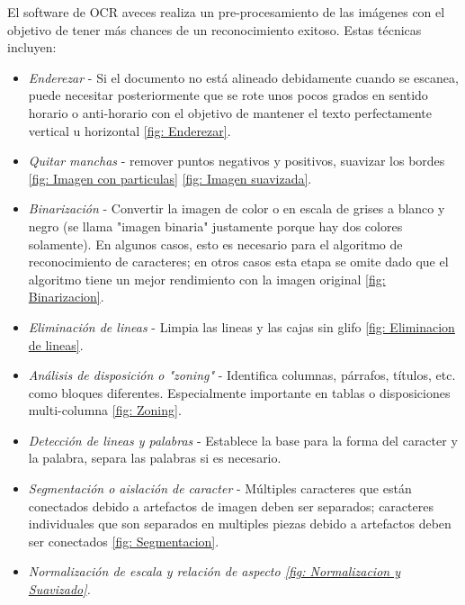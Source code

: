 		 El software de OCR aveces realiza un pre-procesamiento de las imágenes con el objetivo de tener más chances de un reconocimiento exitoso. Estas técnicas incluyen:
		  \begin{itemize}
		  	\item \textit{Enderezar} - Si el documento no está alineado debidamente cuando se escanea, puede necesitar posteriormente que se rote unos pocos grados en sentido horario o anti-horario con el objetivo de mantener el texto perfectamente vertical u horizontal \ref{fig: Enderezar}.
		  	\item \textit{Quitar manchas} - remover puntos negativos  y positivos, suavizar los bordes \ref{fig: Imagen con particulas} \ref{fig: Imagen suavizada}.
		  	\item \textit{Binarización} - Convertir la imagen de color o en escala de grises a blanco y negro (se llama "imagen binaria" justamente porque hay dos colores solamente). En algunos casos, esto es necesario para el algoritmo de reconocimiento de caracteres; en otros casos esta etapa se omite dado que el algoritmo tiene un mejor rendimiento con la imagen original \ref{fig: Binarizacion}.
		  	\item \textit{Eliminación de lineas} - Limpia las lineas y las cajas sin glifo \ref{fig: Eliminacion de lineas}.
		  	\item \textit{Análisis de disposición o "zoning"} - Identifica columnas, párrafos, títulos, etc. como bloques diferentes. Especialmente importante en tablas o disposiciones multi-columna \ref{fig: Zoning}.
		  	\item \textit{Detección de lineas y palabras} - Establece  la base para la forma del caracter y la palabra, separa las palabras si es necesario.
		  	\item \textit{Segmentación o aislación de caracter} - Múltiples caracteres que están conectados debido a artefactos de imagen deben ser separados; caracteres individuales que son separados en multiples piezas debido a artefactos deben ser conectados \ref{fig: Segmentacion}.
		  	\item \textit{Normalización de escala y relación de aspecto \ref{fig: Normalizacion y Suavizado}.}
		  \end{itemize}
		  
